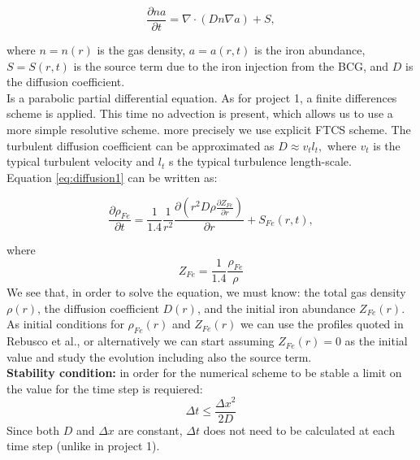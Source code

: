 \documentclass{article}
\begin{document}
\begin{equation}
\frac{\partial na}{\partial t}= \nabla \cdot (Dn\nabla a) + S, \label{eq:diffusion1}
\end{equation}

where \(n=n(r)\) is the gas density, \(a=a(r,t)\) is the iron abundance, \(S=S(r,t)\) is the source term due to the iron injection from the BCG, and \(D\) is the diffusion coefficient.\\ Is a parabolic partial differential equation. As for project 1, a finite differences scheme is applied. This time no advection is present, which allows us to use a more simple resolutive scheme. more precisely we use explicit FTCS scheme.%
The turbulent diffusion coefficient can be approximated as \(D\approx v_{t}l_{t},\) where \(v_{t}\) is the typical turbulent velocity and \(l_{t}\) s the typical turbulence length-scale.\\
Equation \ref{eq:diffusion1} can be written as:

\begin{equation}
\frac{\partial \rho_{Fe}}{\partial t}= \frac{1}{1.4}\frac{1}{r^{2}}\frac{\partial(r^{2}D\rho \frac{\partial Z_{Fe}}{\partial r})}{\partial r} + S_{Fe}(r,t),
\end{equation}

where
\begin{equation}
Z_{Fe}=\frac{1}{1.4}\frac{\rho_{Fe}}{\rho}
\end{equation}
We see that, in order to solve the equation, we must know: the total gas density \(\rho(r)\), the diffusion coefficient \(D(r)\), and the initial iron abundance \(Z_{Fe}(r).\)\\
As initial conditions for \(\rho_{Fe}(r)\) and \(Z_{Fe}(r)\) we can use the profiles quoted in Rebusco et al., or alternatively we can start assuming \(Z_{Fe}(r)=0\) as the initial value and study the evolution including also the source term.\\


\textbf{Stability condition:} in order for the numerical scheme to be stable a limit on the value for the time step is requiered:
\begin{equation*}
    \Delta t \leq \frac{\Delta x^2}{2 D}
\end{equation*}
Since both $D$ and $\Delta x$ are constant, $\Delta t$ does not need to be calculated at each time step (unlike in project 1).
\end{document}
